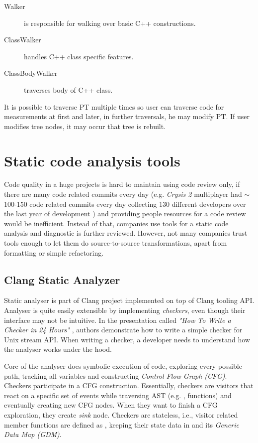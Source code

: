 \begin{description}
\item[Walker] is responsible for walking over basic C++ constructions.
\item[ClassWalker] handles C++ class specific features.
\item[ClassBodyWalker] traverses body of C++ class.
\end{description}

It is possible to traverse PT multiple times so user can traverse code for measurements at first and later, in further traversals, he may modify PT. If user modifies tree nodes, it may occur that tree is rebuilt.

\section{Static code analysis tools}
Code quality in a huge projects is hard to maintain using code review only, if there are many code related commits every day (e.g. \emph{Crysis 2} multiplayer had $\sim$100-150 code related commits every day collecting 130 different developers over the last year of development \cite{crysis}) and providing people resources for a code review would be inefficient. Instead of that, companies use tools for a static code analysis and diagnostic is further reviewed. However, not many companies trust tools enough to let them do source-to-source transformations, apart from formatting or simple refactoring.

\subsection{Clang Static Analyzer}
\label{clang-analyzer}
Static analyser is part of Clang project implemented on top of Clang tooling API. Analyser is quite easily extensible by implementing \emph{checkers}, even though their interface may not be intuitive. In the presentation called \textit{"How To Write a Checker in 24 Hours"} \cite{clang-analyzer-presentation},  authors demonstrate how to write a simple checker for  Unix stream API. When writing a checker, a developer needs to understand how the analyser works under the hood.

Core of the analyser does symbolic execution of code, exploring every possible path, tracking all variables and constructing \emph{Control Flow Graph (CFG)}. Checkers participate in a CFG construction. Essentially, checkers are visitors that react on a specific set of events while traversing AST (e.g. ,  functions) and eventually creating new CFG nodes. When they want to finish a CFG exploration, they create \emph{sink} node. Checkers are stateless, i.e., visitor related member functions are defined as , keeping their state data in  and its \emph{Generic Data Map (GDM)}.


